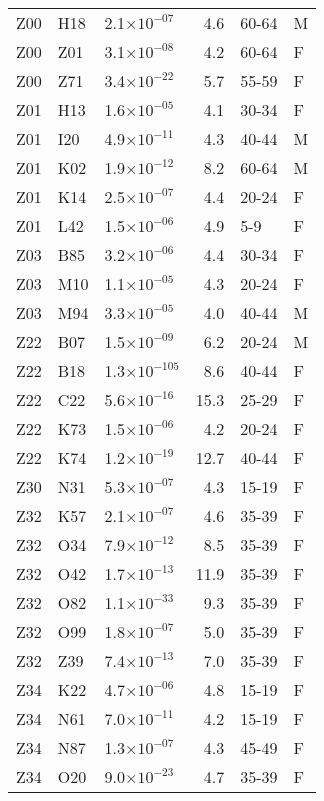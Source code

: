 \begin{longtable}{lllrll}
   Z00 & H18 & 2.1$\times10^{-07}$ & 4.6 & 60-64 & M \\ 
   Z00 & Z01 & 3.1$\times10^{-08}$ & 4.2 & 60-64 & F \\ 
   Z00 & Z71 & 3.4$\times10^{-22}$ & 5.7 & 55-59 & F \\ 
   Z01 & H13 & 1.6$\times10^{-05}$ & 4.1 & 30-34 & F \\ 
   Z01 & I20 & 4.9$\times10^{-11}$ & 4.3 & 40-44 & M \\ 
   Z01 & K02 & 1.9$\times10^{-12}$ & 8.2 & 60-64 & M \\ 
   Z01 & K14 & 2.5$\times10^{-07}$ & 4.4 & 20-24 & F \\ 
   Z01 & L42 & 1.5$\times10^{-06}$ & 4.9 & 5-9 & F \\ 
   Z03 & B85 & 3.2$\times10^{-06}$ & 4.4 & 30-34 & F \\ 
   Z03 & M10 & 1.1$\times10^{-05}$ & 4.3 & 20-24 & F \\ 
   Z03 & M94 & 3.3$\times10^{-05}$ & 4.0 & 40-44 & M \\ 
   Z22 & B07 & 1.5$\times10^{-09}$ & 6.2 & 20-24 & M \\ 
   Z22 & B18 & 1.3$\times10^{-105}$ & 8.6 & 40-44 & F \\ 
   Z22 & C22 & 5.6$\times10^{-16}$ & 15.3 & 25-29 & F \\ 
   Z22 & K73 & 1.5$\times10^{-06}$ & 4.2 & 20-24 & F \\ 
   Z22 & K74 & 1.2$\times10^{-19}$ & 12.7 & 40-44 & F \\ 
   Z30 & N31 & 5.3$\times10^{-07}$ & 4.3 & 15-19 & F \\ 
   Z32 & K57 & 2.1$\times10^{-07}$ & 4.6 & 35-39 & F \\ 
   Z32 & O34 & 7.9$\times10^{-12}$ & 8.5 & 35-39 & F \\ 
   Z32 & O42 & 1.7$\times10^{-13}$ & 11.9 & 35-39 & F \\ 
   Z32 & O82 & 1.1$\times10^{-33}$ & 9.3 & 35-39 & F \\ 
   Z32 & O99 & 1.8$\times10^{-07}$ & 5.0 & 35-39 & F \\ 
   Z32 & Z39 & 7.4$\times10^{-13}$ & 7.0 & 35-39 & F \\ 
   Z34 & K22 & 4.7$\times10^{-06}$ & 4.8 & 15-19 & F \\ 
   Z34 & N61 & 7.0$\times10^{-11}$ & 4.2 & 15-19 & F \\ 
   Z34 & N87 & 1.3$\times10^{-07}$ & 4.3 & 45-49 & F \\ 
   Z34 & O20 & 9.0$\times10^{-23}$ & 4.7 & 35-39 & F \\ 

\end{longtable}
